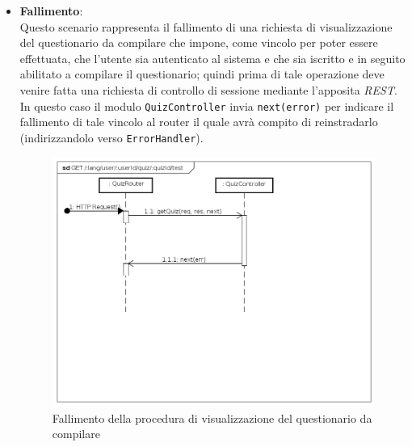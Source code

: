 \begin{itemize}
\item \textbf{Fallimento}:\\
Questo scenario rappresenta il fallimento di una richiesta di visualizzazione del questionario da compilare che impone, come vincolo per poter essere effettuata, che l'utente sia autenticato al sistema e che sia iscritto e in seguito abilitato a compilare il questionario; quindi prima di tale operazione deve venire fatta una richiesta di controllo di sessione mediante l'apposita \textit{REST}. In questo caso il modulo \texttt{QuizController} invia \texttt{next(error)} per indicare il fallimento di tale vincolo al router il quale avrà compito di reinstradarlo (indirizzandolo verso \texttt{ErrorHandler}).
\label{Fallimento della procedura di visualizzazione del questionario da compilare}
\begin{figure}[ht]
	\centering
	\includegraphics[scale=0.40]{UML/DiagrammiDiSequenza/Back-end/GET__lang_user_userId_quiz_quizId_test_failure.png}
	\caption{Fallimento della procedura di visualizzazione del questionario da compilare}
\end{figure}
\FloatBarrier
\end{itemize}

